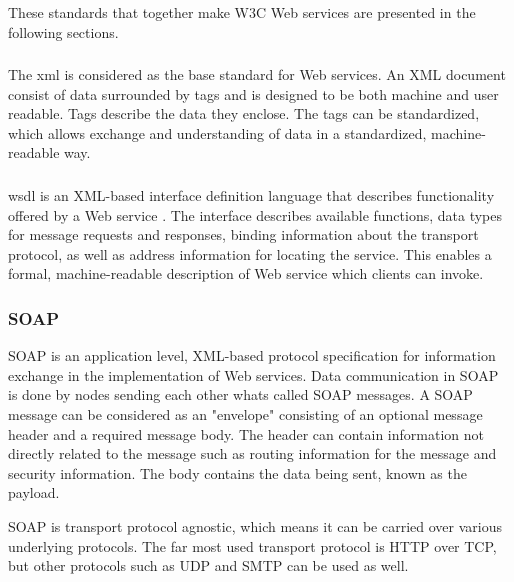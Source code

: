 These standards that together make W3C Web services are presented in the
following sections.

\subsubsection{}

The \gls{xml}\cite{W3C-XML} is considered as the base standard for Web services.
An XML document consist of data surrounded by tags and is designed to be both
machine and user readable. Tags describe the data they enclose. The tags can be
standardized, which allows exchange and understanding of data in a standardized,
machine-readable way.


\subsubsection{}

\gls{wsdl} is an XML-based interface definition language that describes
functionality offered by a Web service \cite{w3c-wsdl}. The interface describes
available functions, data types for message requests and responses, binding
information about the transport protocol, as well as address information for
locating the service. This enables a formal, machine-readable description of Web
service which clients can invoke.

\subsubsection{SOAP}

SOAP is an application level, XML-based protocol specification for information
exchange\cite{w3c-soap} in the implementation of Web services. Data
communication in SOAP is done by nodes sending each other whats called SOAP
messages. A SOAP message can be considered as an "envelope" consisting of an
optional message header and a required message body. The header can contain
information not directly related to the message such as routing information for
the message and security information. The body contains the data being sent,
known as the payload.

SOAP is transport protocol agnostic, which means it can be carried over various
underlying protocols. The far most used transport protocol is HTTP over TCP, but
other protocols such as UDP and SMTP can be used as well.

\subsection{}
\label{rest}

